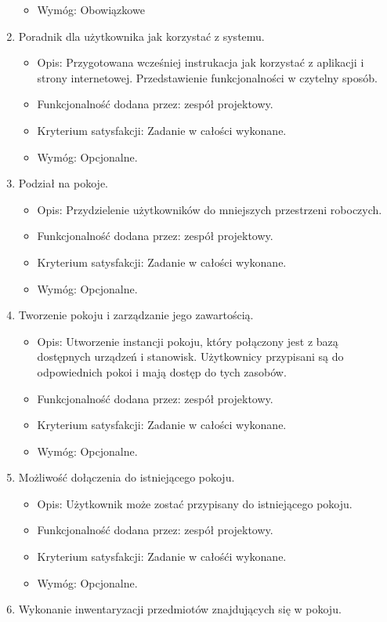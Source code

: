 \documentclass{article}
\begin{document}
\begin{enumerate}
\begin{itemize}
\item Wymóg: Obowiązkowe
\end{itemize}
\item Poradnik dla użytkownika jak korzystać z systemu.
\begin{itemize}
\item Opis: Przygotowana wcześniej instrukacja jak korzystać z aplikacji i strony internetowej. Przedstawienie funkcjonalności w czytelny sposób.
\item Funkcjonalność dodana przez: zespół projektowy.
\item Kryterium satysfakcji: Zadanie w całości wykonane.
\item Wymóg: Opcjonalne.
\end{itemize}
\item Podział na pokoje.
\begin{itemize}
\item Opis: Przydzielenie użytkowników do mniejszych przestrzeni roboczych. 
\item Funkcjonalność dodana przez: zespół projektowy.
\item Kryterium satysfakcji: Zadanie w całości wykonane.
\item Wymóg: Opcjonalne.
\end{itemize}
\item Tworzenie pokoju i zarządzanie jego zawartością.
\begin{itemize}
\item Opis: Utworzenie instancji pokoju, który połączony jest z bazą dostępnych urządzeń i stanowisk. Użytkownicy przypisani są do odpowiednich pokoi i mają dostęp do tych zasobów.
\item Funkcjonalność dodana przez: zespół projektowy.
\item Kryterium satysfakcji: Zadanie w całości wykonane.
\item Wymóg: Opcjonalne.
\end{itemize}
\item Możliwość dołączenia do istniejącego pokoju.
\begin{itemize}
\item Opis: Użytkownik może zostać przypisany do istniejącego pokoju.
\item Funkcjonalność dodana przez: zespół projektowy.
\item Kryterium satysfakcji: Zadanie w całośći wykonane.
\item Wymóg: Opcjonalne.
\end{itemize}
\item Wykonanie inwentaryzacji przedmiotów znajdujących się w pokoju.

\end{enumerate}
\end{document}
